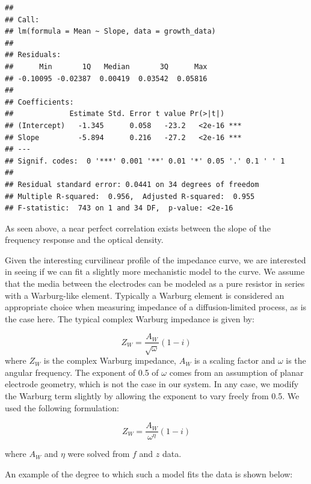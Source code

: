 \documentclass{article}\usepackage[]{graphicx}\usepackage[]{color}
\makeatletter
\newenvironment{kframe}{%
 \def\at@end@of@kframe{}%
 \ifinner\ifhmode%
  \def\at@end@of@kframe{\end{minipage}}%
  \begin{minipage}{\columnwidth}%
 \fi\fi%
 \def\FrameCommand##1{\hskip\@totalleftmargin \hskip-\fboxsep
 \colorbox{shadecolor}{##1}\hskip-\fboxsep
     \hskip-\linewidth \hskip-\@totalleftmargin \hskip\columnwidth}%
 \MakeFramed {\advance\hsize-\width
   \@totalleftmargin\z@ \linewidth\hsize
   \@setminipage}}%
 {\par\unskip\endMakeFramed%
 \at@end@of@kframe}
\newenvironment{knitrout}{}{} %
\makeatother
\begin{document}
\begin{knitrout}
\color{fgcolor}\begin{kframe}
\begin{verbatim}
## 
## Call:
## lm(formula = Mean ~ Slope, data = growth_data)
## 
## Residuals:
##      Min       1Q   Median       3Q      Max 
## -0.10095 -0.02387  0.00419  0.03542  0.05816 
## 
## Coefficients:
##             Estimate Std. Error t value Pr(>|t|)    
## (Intercept)   -1.345      0.058   -23.2   <2e-16 ***
## Slope         -5.894      0.216   -27.2   <2e-16 ***
## ---
## Signif. codes:  0 '***' 0.001 '**' 0.01 '*' 0.05 '.' 0.1 ' ' 1
## 
## Residual standard error: 0.0441 on 34 degrees of freedom
## Multiple R-squared:  0.956,	Adjusted R-squared:  0.955 
## F-statistic:  743 on 1 and 34 DF,  p-value: <2e-16
\end{verbatim}
\end{kframe}
\end{knitrout}


As seen above, a near perfect correlation exists between the slope of the frequency response and the optical density. 

Given the interesting curvilinear profile of the impedance curve, we are interested in seeing if we can fit a slightly more mechanistic model to the curve. We assume that the media between the electrodes can be modeled as a pure resistor in series with a Warburg-like element. Typically a Warburg element is considered an appropriate choice when measuring impedance of a diffusion-limited process, as is the case here. The typical complex Warburg impedance is given by:

$$
Z_W = \frac{A_W}{\sqrt{\omega}} (1 - i)
$$
where $Z_W$ is the complex Warburg impedance, $A_W$ is a scaling factor and $\omega$ is the angular frequency. The exponent of 0.5 of $\omega$ comes from an assumption of planar electrode geometry, which is not the case in our system. In any case, we modify the Warburg term slightly by allowing the exponent to vary freely from 0.5. We used the following formulation:

$$
Z_W = \frac{A_W}{\omega^\eta} (1 - i)
$$

where $A_W$ and $\eta$ were solved from $f$ and $z$ data. 

An example of the degree to which such a model fits the data is shown below:
\end{document}
